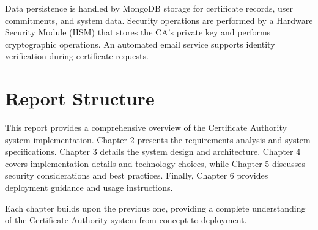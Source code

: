 Data persistence is handled by MongoDB storage for certificate records, user commitments, and system data. 
Security operations are performed by a Hardware Security Module (HSM) that stores the CA's private key and performs cryptographic operations. 
An automated email service supports identity verification during certificate requests.

\section{Report Structure}

This report provides a comprehensive overview of the Certificate Authority system implementation. 
Chapter 2 presents the requirements analysis and system specifications. 
Chapter 3 details the system design and architecture. 
Chapter 4 covers implementation details and technology choices, while Chapter 5 discusses security considerations and best practices. 
Finally, Chapter 6 provides deployment guidance and usage instructions.

Each chapter builds upon the previous one, providing a complete understanding of the Certificate Authority system from concept to deployment.\cite{coulouris} 
